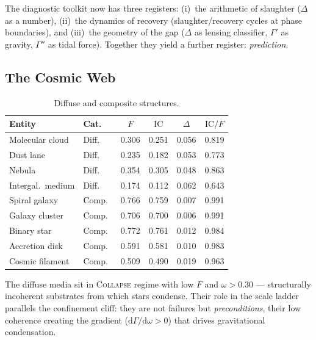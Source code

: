 \documentclass[
  aps,
  prd,
  twocolumn,
  superscriptaddress,
  nofootinbib,
  floatfix
]{revtex4-2}
\newcommand{\Gam}{\Gamma}
\newcommand{\dd}{\mathrm{d}}
\newcommand{\regime}[1]{\textsc{#1}}
\newcommand{\IC}{\mathrm{IC}}
\begin{document}
The diagnostic toolkit now has three registers:
(i)~the arithmetic of slaughter ($\Delta$ as a number),
(ii)~the dynamics of recovery (slaughter/recovery cycles at
phase boundaries), and (iii)~the geometry of the gap ($\Delta$
as lensing classifier, $\Gam'$ as gravity, $\Gam''$ as tidal
force).  Together they yield a further register:
\emph{prediction}.


\subsection{The Cosmic Web}

\begin{table}[htbp]
\caption{\label{tab:cosmic}Diffuse and composite structures.}
\begin{ruledtabular}
\begin{tabular}{llcccc}
Entity & Cat.\ & $F$ & $\IC$ & $\Delta$ & $\IC/F$ \\
\hline
Molecular cloud    & Diff.\ & 0.306 & 0.251 & 0.056 & 0.819 \\
Dust lane          & Diff.\ & 0.235 & 0.182 & 0.053 & 0.773 \\
Nebula             & Diff.\ & 0.354 & 0.305 & 0.048 & 0.863 \\
Intergal.\ medium  & Diff.\ & 0.174 & 0.112 & 0.062 & 0.643 \\
\hline
Spiral galaxy      & Comp.\ & 0.766 & 0.759 & 0.007 & 0.991 \\
Galaxy cluster     & Comp.\ & 0.706 & 0.700 & 0.006 & 0.991 \\
Binary star        & Comp.\ & 0.772 & 0.761 & 0.012 & 0.984 \\
Accretion disk     & Comp.\ & 0.591 & 0.581 & 0.010 & 0.983 \\
Cosmic filament    & Comp.\ & 0.509 & 0.490 & 0.019 & 0.963 \\
\end{tabular}
\end{ruledtabular}
\end{table}

The diffuse media sit in \regime{Collapse} regime with
low $F$ and $\omega > 0.30$ --- structurally incoherent
substrates from which stars condense.  Their role in the
scale ladder parallels the confinement cliff: they are
not failures but \emph{preconditions}, their low coherence
creating the gradient ($\dd\Gam/\dd\omega > 0$) that drives
gravitational condensation.
\end{document}
